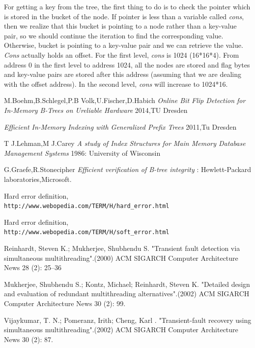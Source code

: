 \documentclass{report}
\begin{document}
For getting a key from the tree, the first thing to do is to check the pointer which is stored in the bucket of the node. If pointer is less than a variable called \textit{cons}, then we realize that this bucket is pointing to a node rather than a key-value pair, so we should continue the iteration to find the corresponding value. Otherwise, bucket is pointing to a key-value pair and we can retrieve the value. \textit{Cons} actually holds an offset. For the first level, \textit{cons} is 1024 (16*16*4). From address 0 in the first level to address 1024, all the nodes are stored and flag bytes and key-value pairs are stored after this address (assuming that we are dealing with the offset address). In the second level, \textit{cons} will increase to 1024*16.

      

\begin{thebibliography}{1}

 M.Boehm,B.Schlegel,P.B Volk,U.Fischer,D.Habich {\em Online Bit Flip Detection for In-Memory B-Trees on Ureliable Hardware} 2014,TU Dresden 

  {\em Efficient In-Memory Indexing with Generalized Prefix Trees} 2011,Tu Dresden

 T J.Lehman,M J.Carey {\em A study of Index Structures for Main Memory Database Management Systems} 1986: University of Wisconsin

 G.Graefe,R.Stonecipher {\em Efficient verification of B-tree integrity} : Hewlett-Packard laboratories,Microsoft.

Hard error definition,\\\texttt{http://www.webopedia.com/TERM/H/hard_error.html}

Hard error definition,\\\texttt{http://www.webopedia.com/TERM/H/soft_error.html}

Reinhardt, Steven K.; Mukherjee, Shubhendu S. "Transient fault detection via simultaneous multithreading".(2000) ACM SIGARCH Computer Architecture News 28 (2): 25–36

Mukherjee, Shubhendu S.; Kontz, Michael; Reinhardt, Steven K. "Detailed design and evaluation of redundant multithreading alternatives".(2002) ACM SIGARCH Computer Architecture News 30 (2): 99.

Vijaykumar, T. N.; Pomeranz, Irith; Cheng, Karl . "Transient-fault recovery using simultaneous multithreading".(2002) ACM SIGARCH Computer Architecture News 30 (2): 87.


\end{thebibliography}
\end{document}

